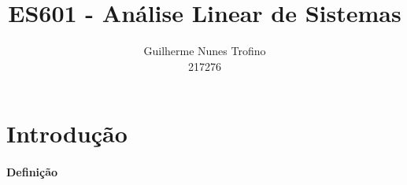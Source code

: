 \documentclass{article}
\title{ES601 - Análise Linear de Sistemas}
\author{Guilherme Nunes Trofino\\217276}
\begin{document}
    \maketitle
\newpage

    \tableofcontents
\newpage

    \section{Introdução}
        \paragraph{Definição}

\begin{multicols}{2}
    \raggedcolumns


\end{multicols}
\end{document}
